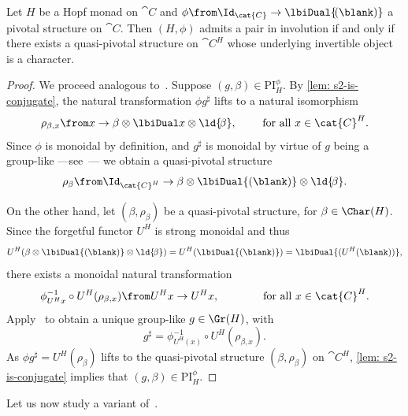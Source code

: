 \begin{proposition}\label{prop: piis_are_qpiv}
  Let \(H\) be a Hopf monad on \(\cat{C}\)
  and \(\phi \from \Id_{\cat{C}} \to \lbiDual{\!(\blank)}\) a pivotal structure on \(\cat{C}\).
  Then \((H, \phi)\) admits a pair in involution
  if and only if
  there exists a quasi-pivotal structure on \(\cat{C}^{H}\)
  whose underlying invertible object is a character.
\end{proposition}
\begin{proof}
  We proceed analogous to~\cite[Proposition~7.6]{Bruguieres2007}.
  Suppose \((g, \beta) \in \mathrm{PI}_{H}^{\phi}\).
  By \cref{lem: s2-is-conjugate}, the natural transformation \(\phi g^{\sharp}\) lifts to a natural isomorphism
  \[
    \rho_{\beta,x}\from x \to \beta \otimes \lbiDual x \otimes \ld{\!\beta}, \qquad \text{ for all } x \in \cat{C}^H.
  \]
  Since \(\phi\) is monoidal by definition,
  and \(g^{\sharp}\) is monoidal by virtue of \(g\) being a group-like%
  —see~\cite[Lemma~3.20]{Bruguieres2007}—%
  we obtain a quasi-pivotal structure
  \[
    \rho_{\beta} \from \Id_{\cat{C}^H} \to \beta \otimes \lbiDual{(\blank)}\otimes \ld{\!\beta}.
  \]

  On the other hand, let \((\beta,\rho_{\beta})\) be a quasi-pivotal structure, for \(\beta \in \Char(H)\).
  Since the forgetful functor \(U^H\) is strong monoidal and thus
  \[
    U^H (\beta\otimes \lbiDual{(\blank)}\otimes \ld{\!\beta}) = U^H(\lbiDual{(\blank)}) = \lbiDual{(U^H(\blank))},
  \]
  there exists a monoidal natural transformation
  \[
    \phi^{-1}_{U^H x} \circ U^H(\rho_{\beta,x}) \from U^H x \to U^H x, \qquad \qquad \text{for all } x \in \cat{C}^H.
  \]
  Apply~\cite[Lemma~3.20]{Bruguieres2007} to
  obtain a unique group-like \(g\in \Gr(H)\), with
  \[
    g^{\sharp} = \phi^{-1}_{U^H(x)} \circ U^H(\rho_{\beta,x}).
  \]
  As \(\phi g^{\sharp} = U^H(\rho_{\beta})\) lifts to the quasi-pivotal structure \((\beta,\rho_{\beta})\) on \(\cat{C}^H\),
  \cref{lem: s2-is-conjugate} implies that \((g, \beta) \in \mathrm{PI}_{H}^{\phi}\).
\end{proof}

Let us now study a variant of~\cite[Lemma~2.9]{Bruguieres2007}.

